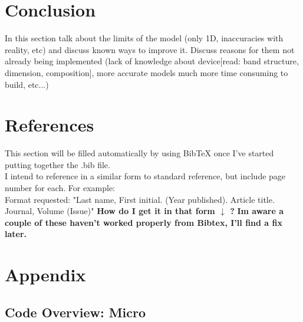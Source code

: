 \documentclass[titlepage]{article}
\begin{document}
\section{Conclusion}
In this section talk about the limits of the model (only 1D, inaccuracies with reality, etc) and discuss known ways to improve it. Discuss reasons for them not already being implemented (lack of knowledge about device[read: band structure, dimension, composition], more accurate models much more time consuming to build, etc...) \\


\section{References}
This section will be filled automatically by using BibTeX once I've started putting together the .bib file.\\
I intend to reference in a similar form to standard reference, but include page number for each. For example:\\
\medbreak
Format requested: "Last name, First initial. (Year published). Article title. Journal, Volume (Issue)" \textbf{How do I get it in that form $\downarrow$ ?} \textbf{Im aware a couple of these haven't worked properly from Bibtex, I'll find a fix later.}
{}

\bigskip

\section{Appendix}
\subsection{Code Overview: Micro}
\end{document}
